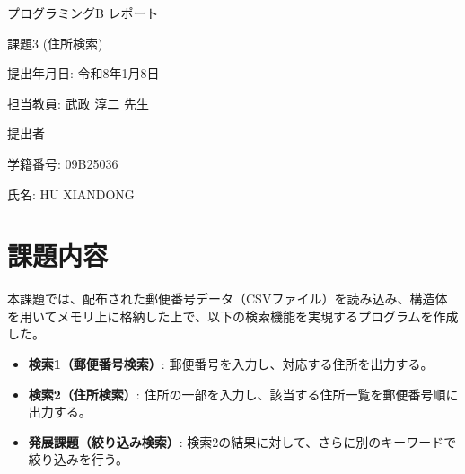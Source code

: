 \documentclass[a4paper,dvipdfmx]{jsarticle}
\newcommand{\reportTitle}{プログラミングB レポート}
\newcommand{\assignmentNum}{課題3 (住所検索)}
\newcommand{\submitDate}{令和8年1月8日}
\newcommand{\teacherName}{武政 淳二 先生}
\newcommand{\studentID}{09B25036}
\newcommand{\studentName}{HU XIANDONG}
\begin{document}
\begin{titlepage}
    \centering
    \vspace*{3cm}
    
    {\Huge \reportTitle}
    
    \vspace{2cm}
    
    {\huge \assignmentNum}
    
    \vspace{4cm}
    
    {\Large 提出年月日: \submitDate}
    
    \vspace{1cm}
    
    {\Large 担当教員: \teacherName}
    
    \vspace{4cm}
    
    {\Large 提出者}
    
    \vspace{1cm}
    
    {\Large 学籍番号: \studentID}
    
    \vspace{0.5cm}
    
    {\Large 氏名: \studentName}
    
\end{titlepage}

\setcounter{page}{1}

\section{課題内容}
本課題では、配布された郵便番号データ（CSVファイル）を読み込み、構造体を用いてメモリ上に格納した上で、以下の検索機能を実現するプログラムを作成した。

\begin{itemize}
    \item \textbf{検索1（郵便番号検索）}: 郵便番号を入力し、対応する住所を出力する。
    \item \textbf{検索2（住所検索）}: 住所の一部を入力し、該当する住所一覧を郵便番号順に出力する。
    \item \textbf{発展課題（絞り込み検索）}: 検索2の結果に対して、さらに別のキーワードで絞り込みを行う。
\end{itemize}
\end{document}
